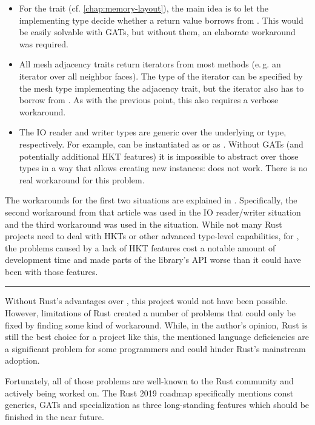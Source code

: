 \begin{itemize}
  \item For the  trait (cf. \autoref{chap:memory-layout}), the main idea is to let the implementing type decide whether a return value borrows from .
  This would be easily solvable with GATs, but without them, an elaborate workaround was required.
  \item All mesh adjacency traits return iterators from most methods (e.\,g. an iterator over all neighbor faces).
  The type of the iterator can be specified by the mesh type implementing the adjacency trait, but the iterator also has to borrow from .
  As with the previous point, this also requires a verbose workaround.
  \item The IO reader and writer types are generic over the underlying  or  type, respectively.
  For example,  can be instantiated as  or as .
  Without GATs (and potentially additional HKT features) it is impossible to abstract over those types in a way that allows creating new instances:  does not work.
  There is no real workaround for this problem.
\end{itemize}

The workarounds for the first two situations are explained in \cite{gatworkaround}.
Specifically, the second workaround from that article was used in the IO reader/writer situation and the third workaround was used in the  situation.
While not many Rust projects need to deal with HKTs or other advanced type-level capabilities, for , the problems caused by a lack of HKT features cost a notable amount of development time and made parts of the library's API worse than it could have been with those features.

\vfill

\begin{center}
\rule{.8\textwidth}{.15mm}
\end{center}

Without Rust's advantages over \cpp, this project would not have been possible.
However, limitations of Rust created a number of problems that could only be fixed by finding some kind of workaround.
While, in the author's opinion, Rust is still the best choice for a project like this, the mentioned language deficiencies are a significant problem for some programmers and could hinder Rust's mainstream adoption.

Fortunately, all of those problems are well-known to the Rust community and actively being worked on.
The Rust 2019 roadmap \cite{rfc2657} specifically mentions const generics, GATs and specialization as three long-standing features which should be finished in the near future.

\vspace{1cm}
